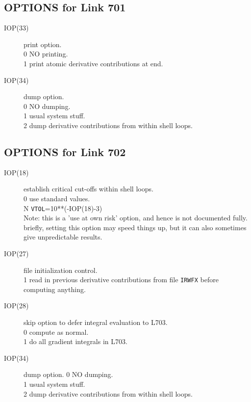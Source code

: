 \subsection{\sf OPTIONS for Link 701}
\begin{description}
\item[IOP(33)]  print option.  \\
0  NO printing. \\
1  print atomic derivative contributions at end. \\
\item[IOP(34)]  dump option.  \\
0  NO dumping. \\
1  usual system stuff. \\
2  dump derivative contributions from within shell loops. \\
\end{description}
\subsection{\sf OPTIONS for Link 702}
\begin{description}
\item[IOP(18)]  establish critical cut-offs within shell loops.  \\
0  use standard values. \\
N {\tt VTOL}=10**(-IOP(18)-3) \\
Note: this is a 'use at own risk' option, and hence is not documented
fully. briefly, setting this option may speed things up, but it
can also sometimes give unpredictable results.  \\
\item[IOP(27)]  file initialization control.  \\
1  read in previous derivative contributions 
from file {\tt IRWFX} before computing anything.  \\
\item[IOP(28)]  skip option to defer integral evaluation  
to L703.  \\
0  compute as normal. \\
1  do all gradient integrals in L703. \\
\item[IOP(34)]  dump option.
0  NO dumping. \\
1  usual system stuff. \\
2  dump derivative contributions from within shell loops. \\
\end{description}

